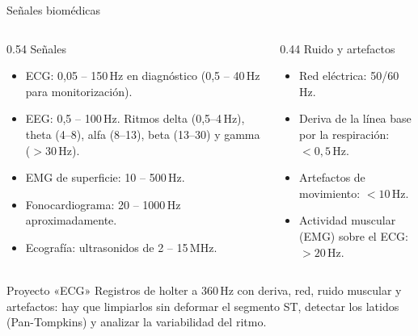 \documentclass[aspectratio=169,11pt]{beamer}
\begin{document}
\begin{frame}{Señales biomédicas}
  \begin{columns}[T]
    \begin{column}{0.54\textwidth}
      \alert{Señales}
      \begin{itemize}\small
        \item \alert{ECG}: 0,05 – 150\,Hz en diagnóstico (0,5 – 40\,Hz para monitorización).
        \item \alert{EEG}: 0,5 – 100\,Hz. Ritmos delta (0,5–4\,Hz), theta (4–8), alfa (8–13), beta (13–30) y gamma ($>30$\,Hz).
        \item \alert{EMG} de superficie: 10 – 500\,Hz.
        \item Fonocardiograma: 20 – 1000\,Hz aproximadamente.
        \item Ecografía: ultrasonidos de 2 – 15\,MHz.
      \end{itemize}
    \end{column}
    \begin{column}{0.44\textwidth}
      \alert{Ruido y artefactos}
      \begin{itemize}\small
        \item Red eléctrica: 50/60\,Hz.
        \item Deriva de la línea base por la respiración: $<0{,}5$\,Hz.
        \item Artefactos de movimiento: $<10$\,Hz.
        \item Actividad muscular (EMG) sobre el ECG: $>20$\,Hz.
      \end{itemize}
    \end{column}
  \end{columns}
  \begin{block}{Proyecto «ECG»}
    \small Registros de holter a 360\,Hz con deriva, red, ruido muscular y artefactos: hay que limpiarlos sin deformar el segmento ST, detectar los latidos (Pan-Tompkins) y analizar la variabilidad del ritmo.
  \end{block}
\end{frame}
\end{document}
